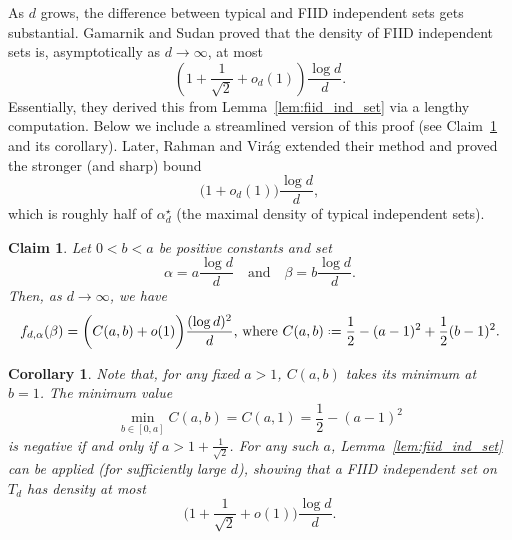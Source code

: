 \documentclass[12pt]{amsart}
\newtheorem{corollary}[theorem]{Corollary}
\newtheorem{claim}[theorem]{Claim}
\theoremstyle{definition}
\newcommand\al{\alpha}
\newcommand\be{\beta}
\newcommand\alstar{\alpha^{\star}}
\newcommand{\defeq}{\mathrel{\vcenter{\baselineskip0.5ex \lineskiplimit0pt
                     \hbox{\scriptsize.}\hbox{\scriptsize.}}}%
                     =}
\begin{document}
As $d$ grows, the difference between typical and FIID independent sets gets substantial. Gamarnik and Sudan proved that the density of FIID independent sets is, asymptotically as $d\to \infty$, at most %
%
\[ \left( 1+\frac{1}{\sqrt{2}}+o_d(1) \right) 
\frac{\log d}{d} .\]
%
Essentially, they derived this from Lemma~\ref{lem:fiid_ind_set} via a lengthy computation. Below we include a streamlined version of this proof (see Claim~\ref{cl:gs_revisited} and its corollary). Later, Rahman and Vir\'ag \cite{rahman2017local} extended their method and proved the stronger (and sharp) bound 
%
\[ \big( 1+o_d(1) \big) \frac{\log d}{d} ,\]
%
which is roughly half of $\alstar_d$ (the maximal density of typical independent sets).

%
\begin{claim} \label{cl:gs_revisited}
Let $0<b<a$ be positive constants and set 
%
\[ \al = a \frac{\log d}{d} 
\quad \text{and} \quad 
\be = b \frac{\log d}{d} .\]
%
Then, as $d \to \infty$, we have 
%
\begin{equation*}
f_{d,\al}(\be) = \bigg( C(a,b) + o(1) \bigg) 
\frac{(\log d)^2}{d} 
\text{, where } 
C(a,b) \defeq \frac 12 - (a-1)^2 + \frac 12 (b-1)^2 .
\end{equation*}
%
\end{claim}
%
\begin{corollary}
Note that, for any fixed $a>1$, $C(a,b)$ takes its minimum at $b=1$. The minimum value 
%
\[ \min_{b \in [0,a]} C(a,b)=C(a,1)= \frac 12 - (a-1)^2 \]
%
is negative if and only if $a>1+\frac{1}{\sqrt 2}$. For any such $a$, Lemma~\ref{lem:fiid_ind_set} can be applied (for sufficiently large $d$), showing that a FIID independent set on $T_d$ has density at most 
%
\[ \bigg( 1+ \frac{1}{\sqrt{2}} +o(1) \bigg) 
\frac{\log d}{d} .\]
%
\end{corollary}
%
\end{document}

